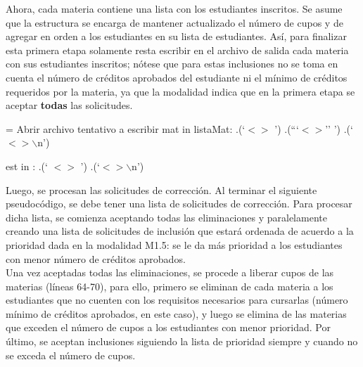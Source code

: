 \documentclass[11pt]{article}
\begin{document}
   Ahora, cada materia contiene una lista con los estudiantes inscritos. Se
   asume que la estructura se encarga de mantener actualizado el número de
   cupos y de agregar en orden a los estudiantes en su lista de estudiantes.
   Así, para finalizar esta primera etapa solamente resta escribir en el
   archivo de salida cada materia con sus estudiantes inscritos; nótese que para
   estas inclusiones no se toma en cuenta el número de créditos aprobados del estudiante
   ni el mínimo de créditos requeridos por la materia, ya que la modalidad
   indica que en la primera etapa se aceptar \textbf{todas} las solicitudes.

   \begin{codebox}
      \li {} = Abrir archivo tentativo a escribir
      \li \For mat in listaMat:
      \Do
         \li {}.(`$<$$>$ ')
         \li {}.(```$<$$>$'' ')
         \li {}.(`$<$$>\backslash$n')
         
         \li \For est in :
         \Do
            \li {}.(`   $<$$>$ ')
            \li {}.(`$<$$>\backslash$n') \label{li:Generar-Archivo-Tentativo-final}
            \End
         \End
         \End
      \End
   \end{codebox}

   Luego, se procesan las solicitudes de corrección. Al terminar el siguiente pseudocódigo, 
   se debe tener una lista de solicitudes de corrección. Para procesar dicha lista, se comienza
   aceptando todas las eliminaciones y paralelamente creando una lista de solicitudes de inclusión
   que estará ordenada de acuerdo a la prioridad dada en la modalidad M1.5: se le da más prioridad a los 
   estudiantes con menor número de créditos aprobados. \\

   Una vez aceptadas todas las eliminaciones, se procede a liberar cupos de las materias (líneas
   64-70),
   para ello, primero se eliminan de cada materia a los estudiantes que no cuenten con los
   requisitos necesarios para cursarlas (número mínimo de créditos aprobados, en este caso),
   y luego se elimina de las materias que exceden el número de cupos a los estudiantes con 
   menor prioridad. Por último, se aceptan
   inclusiones siguiendo la lista de prioridad siempre y cuando no se exceda el número de cupos.
\end{document}
